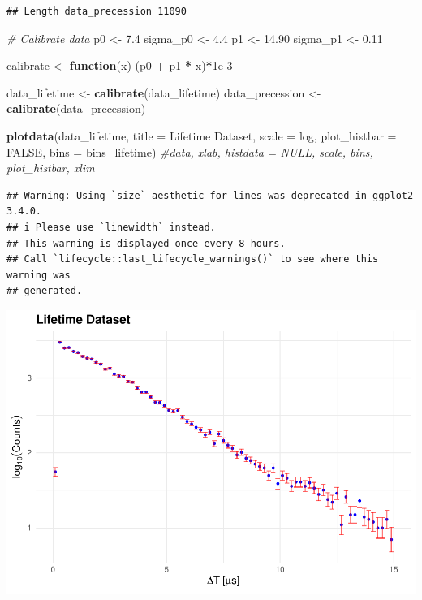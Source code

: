 \documentclass[
]{article}
\newenvironment{Shaded}{\begin{snugshade}}{\end{snugshade}}
\newcommand{\AttributeTok}[1]{\textcolor[rgb]{0.13,0.29,0.53}{#1}}
\newcommand{\CommentTok}[1]{\textcolor[rgb]{0.56,0.35,0.01}{\textit{#1}}}
\newcommand{\ConstantTok}[1]{\textcolor[rgb]{0.56,0.35,0.01}{#1}}
\newcommand{\ControlFlowTok}[1]{\textcolor[rgb]{0.13,0.29,0.53}{\textbf{#1}}}
\newcommand{\FloatTok}[1]{\textcolor[rgb]{0.00,0.00,0.81}{#1}}
\newcommand{\FunctionTok}[1]{\textcolor[rgb]{0.13,0.29,0.53}{\textbf{#1}}}
\newcommand{\NormalTok}[1]{#1}
\newcommand{\OtherTok}[1]{\textcolor[rgb]{0.56,0.35,0.01}{#1}}
\newcommand{\SpecialCharTok}[1]{\textcolor[rgb]{0.81,0.36,0.00}{\textbf{#1}}}
\newcommand{\StringTok}[1]{\textcolor[rgb]{0.31,0.60,0.02}{#1}}
\begin{document}
\begin{verbatim}
## Length data_precession 11090
\end{verbatim}

\begin{Shaded}
\begin{Highlighting}[]
\CommentTok{\# Calibrate data}
\NormalTok{p0       }\OtherTok{\textless{}{-}} \FloatTok{7.4}
\NormalTok{sigma\_p0 }\OtherTok{\textless{}{-}} \FloatTok{4.4}
\NormalTok{p1       }\OtherTok{\textless{}{-}} \FloatTok{14.90}
\NormalTok{sigma\_p1 }\OtherTok{\textless{}{-}} \FloatTok{0.11}

\NormalTok{calibrate }\OtherTok{\textless{}{-}} \ControlFlowTok{function}\NormalTok{(x) (p0 }\SpecialCharTok{+}\NormalTok{ p1 }\SpecialCharTok{*}\NormalTok{ x)}\SpecialCharTok{*}\FloatTok{1e{-}3}

\NormalTok{data\_lifetime   }\OtherTok{\textless{}{-}} \FunctionTok{calibrate}\NormalTok{(data\_lifetime)}
\NormalTok{data\_precession }\OtherTok{\textless{}{-}} \FunctionTok{calibrate}\NormalTok{(data\_precession)}
\end{Highlighting}
\end{Shaded}

\begin{Shaded}
\begin{Highlighting}[]
\FunctionTok{plotdata}\NormalTok{(data\_lifetime, }\AttributeTok{title =} \StringTok{\textquotesingle{}Lifetime Dataset\textquotesingle{}}\NormalTok{, }\AttributeTok{scale =} \StringTok{\textquotesingle{}log\textquotesingle{}}\NormalTok{, }\AttributeTok{plot\_histbar =} \ConstantTok{FALSE}\NormalTok{, }\AttributeTok{bins =}\NormalTok{ bins\_lifetime) }\CommentTok{\#data, xlab, histdata = NULL, scale, bins, plot\_histbar, xlim}
\end{Highlighting}
\end{Shaded}

\begin{verbatim}
## Warning: Using `size` aesthetic for lines was deprecated in ggplot2 3.4.0.
## i Please use `linewidth` instead.
## This warning is displayed once every 8 hours.
## Call `lifecycle::last_lifecycle_warnings()` to see where this warning was
## generated.
\end{verbatim}

\includegraphics{BinnedAnalysis_files/figure-latex/unnamed-chunk-3-1.pdf}
\end{document}

